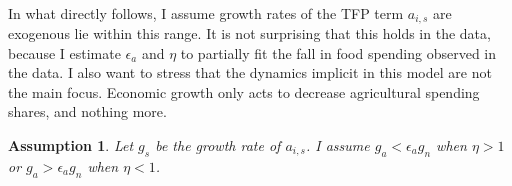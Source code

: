 \documentclass[]{article}
\theoremstyle{plain}
\newtheorem{assumption}{Assumption}
\begin{document}
\paragraph*{}
In what directly follows, I assume growth rates of the TFP term $a_{i, s}$ are exogenous lie within this range. It is not surprising that this holds in the data, because I estimate $\epsilon_{a}$ and $\eta$ to partially fit the fall in food spending observed in the data. I also want to stress that the dynamics implicit in this model are not the main focus. Economic growth only acts to decrease agricultural spending shares, and nothing more. 
\begin{assumption}\label{assump:growthrates}
Let $g_{s}$ be the growth rate of $a_{i,s}$. I assume $g_{a} < \epsilon_{a}g_{n}$ when $\eta > 1$ or $g_{a} > \epsilon_{a}g_{n}$ when $\eta < 1$.
\end{assumption}


 
\end{document}
